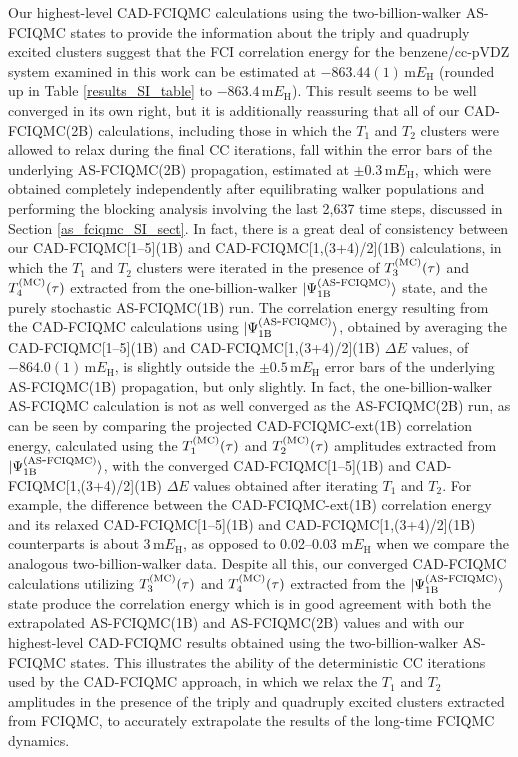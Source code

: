 \documentclass[journal=jcp,manuscript=suppinfo]{achemso}
\begin{document}
Our highest-level CAD-FCIQMC calculations using the two-billion-walker AS-FCIQMC states to provide
the information about the triply and quadruply excited clusters suggest that the FCI correlation
energy for the benzene/cc-pVDZ system examined in this work can be estimated at
$-863.44(1) \, \text{m}E_{\text{H}}$ (rounded up in Table \ref{results_SI_table}
to $-863.4 \, \text{m}E_{\text{H}}$). This result seems to be well converged in its own right,
but it is additionally reassuring that all of our CAD-FCIQMC(2B) calculations, including
those in which the $T_{1}$ and $T_{2}$ clusters were allowed to relax during the final
CC iterations, fall within the error bars of the underlying AS-FCIQMC(2B) propagation,
estimated at $\pm 0.3 \, \text{m}E_{\text{H}}$, which were obtained completely independently
after equilibrating walker populations and performing the blocking analysis involving
the last 2,637 time steps, discussed in Section \ref{as_fciqmc_SI_sect}. In fact, there is a
great deal of consistency between our CAD-FCIQMC[1--5](1B) and CAD-FCIQMC[1,(3+4)/2](1B)
calculations, in which the $T_{1}$ and $T_{2}$ clusters were iterated in the presence of
$T_{3}^{\rm (MC)}(\tau)$ and $T_{4}^{\rm (MC)}(\tau)$ extracted from the one-billion-walker
$|\Psi_{\rm 1B}^{\rm (AS\mbox{-}FCIQMC)}\rangle$ state, and the purely stochastic
AS-FCIQMC(1B) run. The correlation energy resulting from the CAD-FCIQMC calculations
using $|\Psi_{\rm 1B}^{\rm (AS\mbox{-}FCIQMC)}\rangle$, obtained by averaging
the CAD-FCIQMC[1--5](1B) and CAD-FCIQMC[1,(3+4)/2](1B) $\Delta E$ values, of
$-864.0(1) \, \text{m}E_{\text{H}}$, is slightly outside the $\pm 0.5 \, \text{m}E_{\text{H}}$
error bars of the underlying AS-FCIQMC(1B) propagation, but only slightly. In fact,
the one-billion-walker AS-FCIQMC calculation is not as well converged as the
AS-FCIQMC(2B) run, as can be seen by comparing the projected CAD-FCIQMC-ext(1B) correlation
energy, calculated using the $T_{1}^{\rm (MC)}(\tau)$ and $T_{2}^{\rm (MC)}(\tau)$
amplitudes extracted from $|\Psi_{\rm 1B}^{\rm (AS\mbox{-}FCIQMC)}\rangle$,
with the converged CAD-FCIQMC[1--5](1B) and CAD-FCIQMC[1,(3+4)/2](1B) $\Delta E$
values obtained after iterating $T_{1}$ and $T_{2}$. For example, the difference between
the CAD-FCIQMC-ext(1B) correlation energy and its relaxed CAD-FCIQMC[1--5](1B) and
CAD-FCIQMC[1,(3+4)/2](1B) counterparts is about $3 \, \text{m}E_{\text{H}}$, as opposed
to 0.02--0.03 $\text{m}E_{\text{H}}$ when we compare the analogous two-billion-walker
data. Despite all this, our converged
CAD-FCIQMC calculations utilizing $T_{3}^{\rm (MC)}(\tau)$ and $T_{4}^{\rm (MC)}(\tau)$
extracted from the $|\Psi_{\rm 1B}^{\rm (AS\mbox{-}FCIQMC)}\rangle$ state produce
the correlation energy which is in good agreement with both the extrapolated AS-FCIQMC(1B)
and AS-FCIQMC(2B) values and with our highest-level CAD-FCIQMC results obtained
using the two-billion-walker AS-FCIQMC states. This illustrates the
ability of the deterministic CC iterations used by the CAD-FCIQMC approach,
in which we relax the $T_{1}$ and $T_{2}$ amplitudes in the presence of the
triply and quadruply excited clusters extracted from FCIQMC,
to accurately extrapolate the results of the long-time FCIQMC dynamics.
\end{document}
